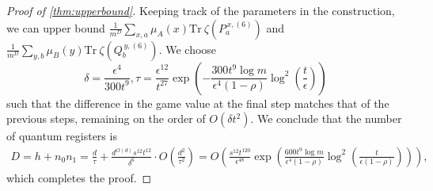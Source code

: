 \documentclass[10pt,a4paper]{article}
\theoremstyle{plain}
\theoremstyle{definition}
\newcommand {\br} [1] {\ensuremath{ \left( #1 \right) }}
\newcommand {\Tr} {\ensuremath{ \mathrm{Tr} }}
\newcommand{\Pnn}[1] {\ensuremath{{P^{\,x, (#1)}_a}}}
\newcommand{\Qnn}[1] {\ensuremath{{Q^{\,y, (#1)}_b}}}
\newcommand{\1}{\mathbb{1}} %
\begin{document}
\begin{proof}[Proof of \cref{thm:upperbound}]
Keeping track of the parameters in the construction, we can upper bound $\frac{1}{m^{D}}\sum_{x,a}\mu_A(x)\Tr~\zeta\br{\Pnn{6}}$ and $\frac{1}{m^{D}}\sum_{y,b}\mu_B(y)\Tr~\zeta\br{\Qnn{6}}$. 
We choose
\begin{equation}\label{eqn:paramters}
  \delta=\frac{\epsilon^4}{300t^9}, \tau=\frac{\epsilon^{12}}{t^{27}}\exp\br{-\frac{300t^{9}\log m}{\epsilon^4(1-\rho)}\log^2\br{\frac{t}{\epsilon}}}
\end{equation}
such that the difference in the game value at the final step matches that of the previous steps, remaining on the order of $O(\delta t^2)$. We conclude that the number of quantum registers is
 \begin{align*}
     D = h + n_0n_1 = \frac{d}{\tau} + \frac{d^{O(d)}s^{12}t^{12}}{\delta^6}\cdot O\br{\frac{d^2}{\tau^2}} = O\br{\frac{s^{12}t^{120}}{\epsilon^{48}}\exp\br{\frac{600t^{9}\log m}{\epsilon^4(1-\rho)}\log^2\br{\frac{t}{\epsilon(1-\rho)}}}},
 \end{align*}
 which completes the proof.
\end{proof}
%
\end{document}

